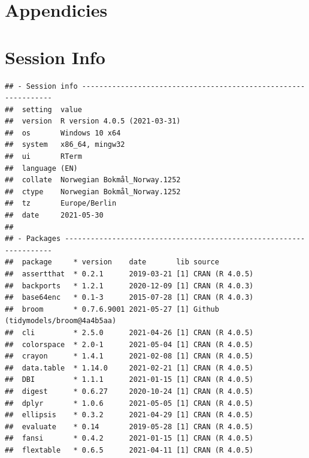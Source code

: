\documentclass[
  11pt,
]{article}
\begin{document}
\clearpage

\hypertarget{appendicies}{%
\section*{Appendicies}\label{appendicies}}

\clearpage

\hypertarget{session-info}{%
\section*{Session Info}\label{session-info}}

\begin{verbatim}
## - Session info ---------------------------------------------------------------
##  setting  value                       
##  version  R version 4.0.5 (2021-03-31)
##  os       Windows 10 x64              
##  system   x86_64, mingw32             
##  ui       RTerm                       
##  language (EN)                        
##  collate  Norwegian Bokmål_Norway.1252
##  ctype    Norwegian Bokmål_Norway.1252
##  tz       Europe/Berlin               
##  date     2021-05-30                  
## 
## - Packages -------------------------------------------------------------------
##  package     * version    date       lib source                           
##  assertthat  * 0.2.1      2019-03-21 [1] CRAN (R 4.0.5)                   
##  backports   * 1.2.1      2020-12-09 [1] CRAN (R 4.0.3)                   
##  base64enc   * 0.1-3      2015-07-28 [1] CRAN (R 4.0.3)                   
##  broom       * 0.7.6.9001 2021-05-27 [1] Github (tidymodels/broom@4a4b5aa)
##  cli         * 2.5.0      2021-04-26 [1] CRAN (R 4.0.5)                   
##  colorspace  * 2.0-1      2021-05-04 [1] CRAN (R 4.0.5)                   
##  crayon      * 1.4.1      2021-02-08 [1] CRAN (R 4.0.5)                   
##  data.table  * 1.14.0     2021-02-21 [1] CRAN (R 4.0.5)                   
##  DBI         * 1.1.1      2021-01-15 [1] CRAN (R 4.0.5)                   
##  digest      * 0.6.27     2020-10-24 [1] CRAN (R 4.0.5)                   
##  dplyr       * 1.0.6      2021-05-05 [1] CRAN (R 4.0.5)                   
##  ellipsis    * 0.3.2      2021-04-29 [1] CRAN (R 4.0.5)                   
##  evaluate    * 0.14       2019-05-28 [1] CRAN (R 4.0.5)                   
##  fansi       * 0.4.2      2021-01-15 [1] CRAN (R 4.0.5)                   
##  flextable   * 0.6.5      2021-04-11 [1] CRAN (R 4.0.5)                   

\end{verbatim}
\end{document}
